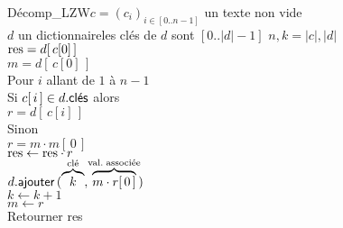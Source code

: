 	\begin{algo}{Décomp\_LZW}{\(c = (c_i)_{i\in[0..n-1]}\) un texte non vide \\ \aentspace \(d\) un dictionnaire}{}{les clés de \(d\) sont $[0..|d|-1]$}
		\(n,k = |c|, |d|\) \\
		\(\rm{res} = d[\,c[0]\,]\) \\
		\(m = d[\,c[0]\,]\) \\
		Pour \(i\) allant de \(1\) à \(n-1\) \\ \Indp
			Si \(c[\,i\,] \in d.\text{\textsf{clés}}\) alors \\ \Indp
				\(r = d[\,c[i]\,]\) \\ \Indm
			Sinon \\ \Indp
				\(r = m \cdot m[\,0\,]\) \\ \Indm
			\(\rm{res} \gets \rm{res} \cdot r\) \\
			\(d.\text{\textsf{ajouter}}\,(\overbrace{k}^{\text{clé}}, \!\overbrace{m\cdot r[\,0\,]}^{\text{val. \!associée}} \!)\) \\
			\(k \gets k+1\) \\
			\(m \gets r\) \\ \Indm
		Retourner res
	\end{algo}

